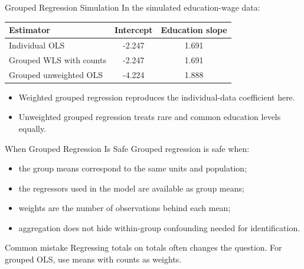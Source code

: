 \documentclass[11pt,aspectratio=169]{beamer}
\begin{document}
\begin{frame}{Grouped Regression Simulation}
  In the simulated education-wage data:
  \vspace{0.3em}

  \begin{center}
    \begin{tabular}{@{}lcc@{}}
      \toprule
      Estimator & Intercept & Education slope \\
      \midrule
      Individual OLS & -2.247 & 1.691 \\
      Grouped WLS with counts & -2.247 & 1.691 \\
      Grouped unweighted OLS & -4.224 & 1.888 \\
      \bottomrule
    \end{tabular}
  \end{center}
  \vspace{0.3em}
  \begin{itemize}
    \item Weighted grouped regression reproduces the individual-data coefficient here.
    \item Unweighted grouped regression treats rare and common education levels equally.
  \end{itemize}
\end{frame}

\begin{frame}{When Grouped Regression Is Safe}
  Grouped regression is safe when:
  \begin{itemize}
    \item the group means correspond to the same units and population;
    \item the regressors used in the model are available as group means;
    \item weights are the number of observations behind each mean;
    \item aggregation does not hide within-group confounding needed for identification.
  \end{itemize}
  \begin{block}{Common mistake}
    Regressing totals on totals often changes the question. For grouped OLS, use means with counts as weights.
  \end{block}
\end{frame}
\end{document}
